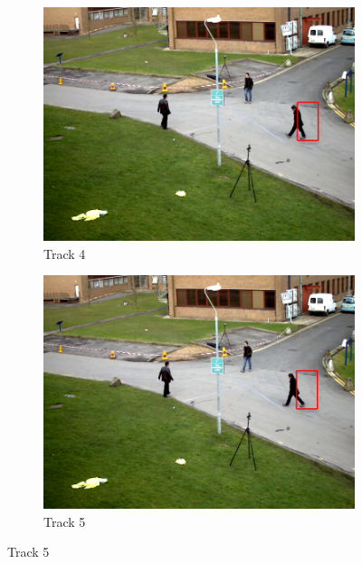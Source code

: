 \documentclass[a4paper,11]{article}
\begin{document}
    \begin{figure}[H]\ContinuedFloat
  \begin{subfigure}{0.5\textwidth}
   \centering
   \includegraphics[width=0.8\linewidth]{track4.png}
   \caption{Track 4}
   \end{subfigure}
   \begin{subfigure}{0.5\textwidth}
    \centering
    \includegraphics[width=0.8\linewidth]{track5.png}
    \caption{Track 5}
   \end{subfigure}
     \vspace{1em}
   

\end{figure}
\end{document}

